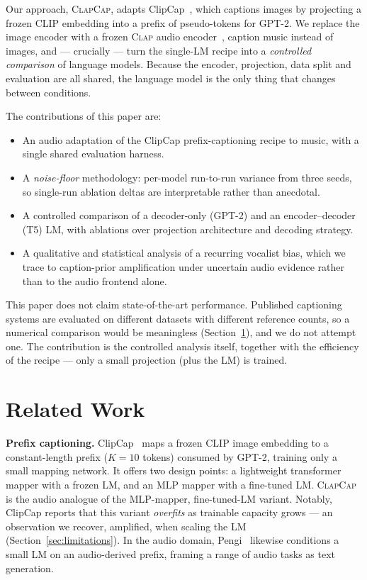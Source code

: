 \documentclass{article}
\newcommand{\clapenc}{\textsc{Clap}}
\newcommand{\sys}{\textsc{ClapCap}}
\begin{document}
Our approach, \sys{}, adapts ClipCap~\cite{mokady2021clipcap}, which captions images by
projecting a frozen CLIP embedding into a prefix of pseudo-tokens for GPT-2. We replace the image
encoder with a frozen \clapenc{} audio encoder~\cite{wu2023clap}, caption music instead of
images, and --- crucially --- turn the single-LM recipe into a \emph{controlled comparison} of
language models. Because the encoder, projection, data split and evaluation are all shared, the
language model is the only thing that changes between conditions.

The contributions of this paper are:
\begin{itemize}\itemsep2pt
  \item An audio adaptation of the ClipCap prefix-captioning recipe to music, with a single
        shared evaluation harness.
  \item A \emph{noise-floor} methodology: per-model run-to-run variance from three seeds, so
        single-run ablation deltas are interpretable rather than anecdotal.
  \item A controlled comparison of a decoder-only (GPT-2) and an encoder--decoder (T5) LM, with
        ablations over projection architecture and decoding strategy.
  \item A qualitative and statistical analysis of a recurring vocalist bias, which we trace to
        caption-prior amplification under uncertain audio evidence rather than to the audio
        frontend alone.
\end{itemize}

This paper does not claim state-of-the-art performance. Published captioning systems are
evaluated on different datasets with different reference counts, so a numerical comparison
would be meaningless (Section~\ref{sec:related}), and we do not attempt one. The contribution
is the controlled analysis itself, together with the efficiency of the recipe --- only a small
projection (plus the LM) is trained.

\section{Related Work}\label{sec:related}

\textbf{Prefix captioning.}
ClipCap~\cite{mokady2021clipcap} maps a frozen CLIP image embedding to a constant-length prefix
($K{=}10$ tokens) consumed by GPT-2, training only a small mapping network. It offers two design
points: a lightweight transformer mapper with a frozen LM, and an MLP mapper with a fine-tuned
LM. \sys{} is the audio analogue of the MLP-mapper, fine-tuned-LM variant. Notably, ClipCap
reports that this variant \emph{overfits} as trainable capacity grows --- an observation we
recover, amplified, when scaling the LM (Section~\ref{sec:limitations}). In the audio domain,
Pengi~\cite{deshmukh2023pengi} likewise conditions a small LM on an audio-derived prefix,
framing a range of audio tasks as text generation.
\end{document}
